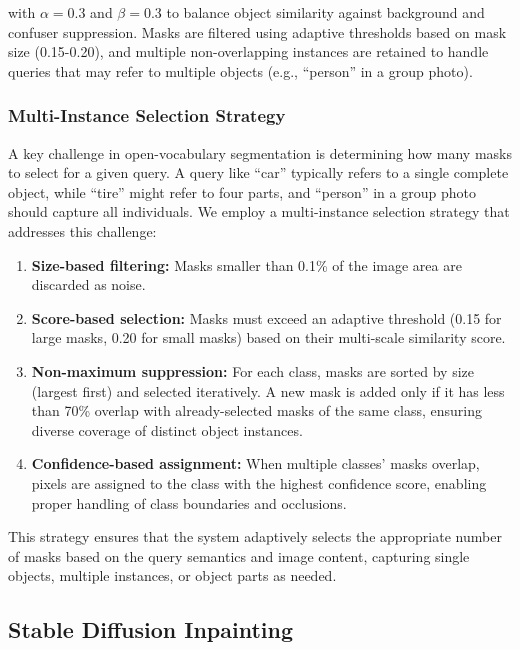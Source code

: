 with $\alpha = 0.3$ and $\beta = 0.3$ to balance object similarity against background and confuser suppression. Masks are filtered using adaptive thresholds based on mask size (0.15-0.20), and multiple non-overlapping instances are retained to handle queries that may refer to multiple objects (e.g., ``person'' in a group photo).

\subsubsection{Multi-Instance Selection Strategy}

A key challenge in open-vocabulary segmentation is determining how many masks to select for a given query. A query like ``car'' typically refers to a single complete object, while ``tire'' might refer to four parts, and ``person'' in a group photo should capture all individuals. We employ a multi-instance selection strategy that addresses this challenge:

\begin{enumerate}
    \item \textbf{Size-based filtering:} Masks smaller than 0.1\% of the image area are discarded as noise.

    \item \textbf{Score-based selection:} Masks must exceed an adaptive threshold (0.15 for large masks, 0.20 for small masks) based on their multi-scale similarity score.

    \item \textbf{Non-maximum suppression:} For each class, masks are sorted by size (largest first) and selected iteratively. A new mask is added only if it has less than 70\% overlap with already-selected masks of the same class, ensuring diverse coverage of distinct object instances.

    \item \textbf{Confidence-based assignment:} When multiple classes' masks overlap, pixels are assigned to the class with the highest confidence score, enabling proper handling of class boundaries and occlusions.
\end{enumerate}

This strategy ensures that the system adaptively selects the appropriate number of masks based on the query semantics and image content, capturing single objects, multiple instances, or object parts as needed.

\subsection{Stable Diffusion Inpainting}

